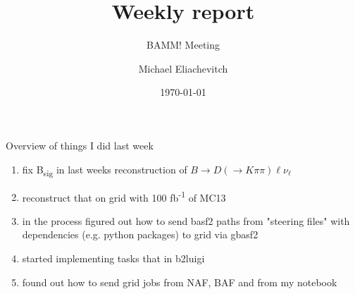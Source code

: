 \documentclass[aspectratio=169, 16pt]{beamer}
\author{Michael Eliachevitch}
\date{\today}
\title{Weekly report}
\subtitle{BAMM! Meeting}
\institute{Physikalisches Institut --- Rheinische Friedrich-Wilhelms-Universität Bonn}
\begin{document}
\maketitle
\begin{frame}[label={sec:org8fcde09}]{Overview of things I did last week}
\begin{enumerate}
\item fix B\textsubscript{sig} in last weeks reconstruction of \(B \rightarrow D (\rightarrow K\pi\pi) \ell \nu_{\ell}\)
\item reconstruct that on grid with 100 fb\textsuperscript{-1} of MC13
\item in the process figured out how to send basf2 paths from "steering files" with
dependencies (e.g. python packages) to grid via gbasf2
\item started implementing tasks that in b2luigi
\item found out how to send grid jobs from NAF, BAF and from my notebook
\end{enumerate}
\end{frame}
\end{document}
